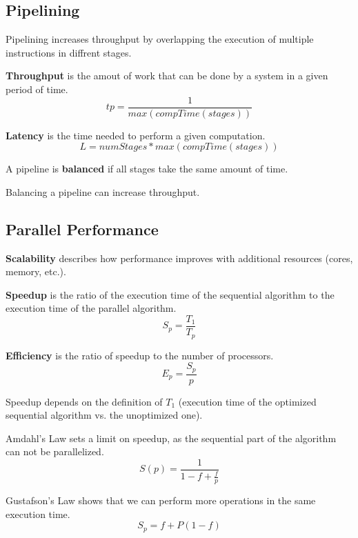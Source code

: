 \subsection{Pipelining}

Pipelining increases throughput by overlapping the execution of multiple instructions in diffrent stages.


\begin{definition}
\textbf{Throughput } 
is the amout of work that can be done by a system in a given period of time. 
$$tp = \frac{1}{max(compTime(stages))}$$
\end{definition}

\begin{definition}
\textbf{Latency } is the time needed to perform a given computation.
$$L = numStages * max(compTime(stages))$$
\end{definition}

\begin{definition}
A pipeline is \textbf{balanced } if all stages take the same amount of time.            
\end{definition}

\begin{important}
Balancing a pipeline can increase throughput.
\end{important}

\subsection{Parallel Performance}

\begin{definition}
\textbf{Scalability } describes how performance improves with additional resources (cores, memory, etc.).
\end{definition}

\begin{definition}
\textbf{Speedup } is the ratio of the execution time of the sequential algorithm to the execution time of the parallel algorithm.
$$S_p = \frac{T_1}{T_p}$$
\end{definition}

\begin{definition}
\textbf{Efficiency } is the ratio of speedup to the number of processors.
$$E_p = \frac{S_p}{p}$$
\end{definition}

\begin{remark}
Speedup depends on the definition of $T_1$ (execution time of the optimized sequential algorithm vs. the unoptimized one).
\end{remark}

\begin{theorem}
Amdahl's Law sets a limit on speedup, as the sequential part of the algorithm can not be parallelized.
$$S(p) = \frac{1}{1-f + \frac{f}{p}}$$
\end{theorem}


\begin{theorem}
Gustafson's Law shows that we can perform more operations in the same execution time.
$$S_p = f + P(1 - f)$$
\end{theorem}


